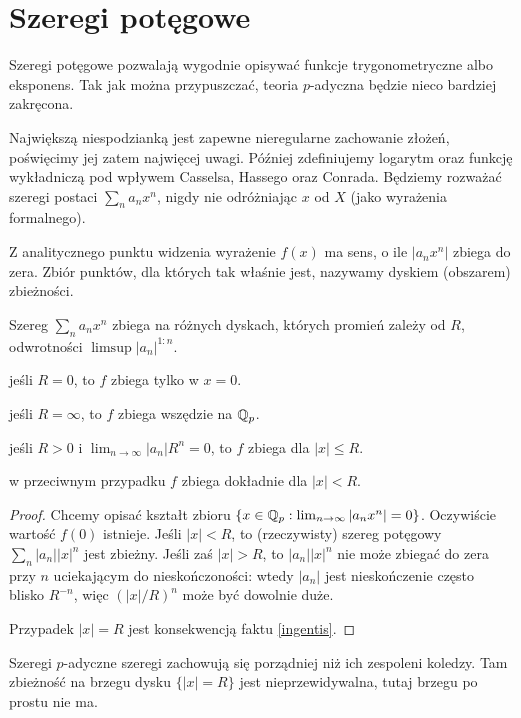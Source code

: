 \section{Szeregi potęgowe}
Szeregi  potęgowe pozwalają wygodnie opisywać funkcje trygonometryczne albo eksponens.
Tak jak można przypuszczać, teoria $p$-adyczna będzie nieco bardziej zakręcona.

Największą niespodzianką jest zapewne nieregularne zachowanie złożeń, poświęcimy jej zatem najwięcej uwagi.
Później zdefiniujemy logarytm oraz funkcję wykładniczą pod wpływem Casselsa, Hassego oraz Conrada.
Będziemy rozważać szeregi postaci $\sum_n a_n x^n$, nigdy nie odróżniając $x$ od $X$ (jako wyrażenia formalnego).

Z analitycznego punktu widzenia wyrażenie $f(x)$ ma sens, o ile $|a_n x^n|$ zbiega do zera.
Zbiór punktów, dla których tak właśnie jest, nazywamy dyskiem (obszarem) zbieżności.

\begin{fakt}
	Szereg $\sum_n a_n x^n$ zbiega na różnych dyskach, których promień zależy od $R$, odwrotności $\limsup |a_n|^{1:n}$.
	\begin{enumx}
	\item jeśli $R = 0$, to $f$ zbiega tylko w $x = 0$.
	\item jeśli $R = \infty$, to $f$ zbiega wszędzie na $\mathbb Q_p$.
	\item jeśli $R > 0$ i $\lim_{n \to \infty} |a_n| R^n = 0$, to $f$ zbiega dla $|x| \le R$.
	\item w przeciwnym przypadku $f$ zbiega dokładnie dla $|x| < R$.
	\end{enumx}
\end{fakt}

\begin{proof}
	Chcemy opisać kształt zbioru $\{x \in \mathbb Q_p : \lim_{n \to \infty} |a_n x^n| = 0\}$.
	Oczywiście wartość $f(0)$ istnieje.
	Jeśli $|x| < R $, to (rzeczywisty) szereg potęgowy $\sum_n |a_n| |x|^n$ jest zbieżny.
	Jeśli zaś $|x| > R $, to $|a_n| |x|^n$ nie może zbiegać do zera przy $n$ uciekającym do nieskończoności: wtedy $|a_n|$ jest nieskończenie często blisko $R ^{-n}$, więc $(|x|/R )^n$ może być dowolnie duże.
	
	Przypadek $|x| = R $ jest konsekwencją faktu \ref{ingentis}.
\end{proof}

Szeregi $p$-adyczne szeregi zachowują się porządniej niż ich zespoleni koledzy.
Tam zbieżność na brzegu dysku $\{|x| = R \}$ jest nieprzewidywalna, tutaj brzegu po prostu nie ma.

